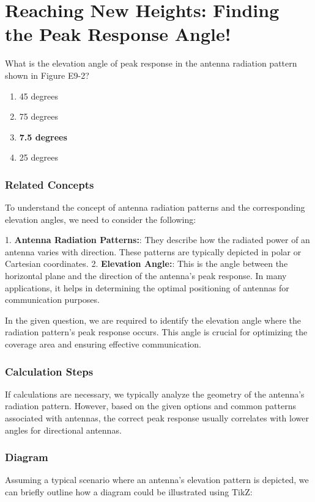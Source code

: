 \section{Reaching New Heights: Finding the Peak Response Angle!}

\begin{tcolorbox}[colback=gray!10, colframe=black, title=E9B06]
What is the elevation angle of peak response in the antenna radiation pattern shown in Figure E9-2?
\begin{enumerate}[label=\Alph*.]
    \item 45 degrees
    \item 75 degrees
    \item \textbf{7.5 degrees}
    \item 25 degrees
\end{enumerate} \end{tcolorbox}

\subsubsection{Related Concepts}
To understand the concept of antenna radiation patterns and the corresponding elevation angles, we need to consider the following:

1. \textbf{Antenna Radiation Patterns:}: They describe how the radiated power of an antenna varies with direction. These patterns are typically depicted in polar or Cartesian coordinates.
2. \textbf{Elevation Angle:}: This is the angle between the horizontal plane and the direction of the antenna's peak response. In many applications, it helps in determining the optimal positioning of antennas for communication purposes.

In the given question, we are required to identify the elevation angle where the radiation pattern's peak response occurs. This angle is crucial for optimizing the coverage area and ensuring effective communication.

\subsubsection{Calculation Steps}
If calculations are necessary, we typically analyze the geometry of the antenna's radiation pattern. However, based on the given options and common patterns associated with antennas, the correct peak response usually correlates with lower angles for directional antennas.

\subsubsection{Diagram}
Assuming a typical scenario where an antenna's elevation pattern is depicted, we can briefly outline how a diagram could be illustrated using TikZ:

